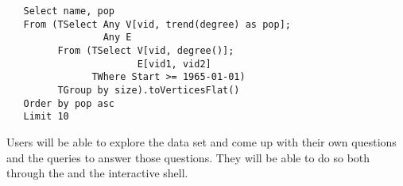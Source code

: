 \begin{small}
\begin{verbatim}
   Select name, pop
   From (TSelect Any V[vid, trend(degree) as pop];
                 Any E
         From (TSelect V[vid, degree()]; 
                       E[vid1, vid2]
               TWhere Start >= 1965-01-01)
         TGroup by size).toVerticesFlat()
   Order by pop asc
   Limit 10
\end{verbatim}
\end{small}

Users will be able to explore the data set and come up with their own
questions and the queries to answer those questions.  They will be
able to do so both through the \qlui and the interactive shell.

